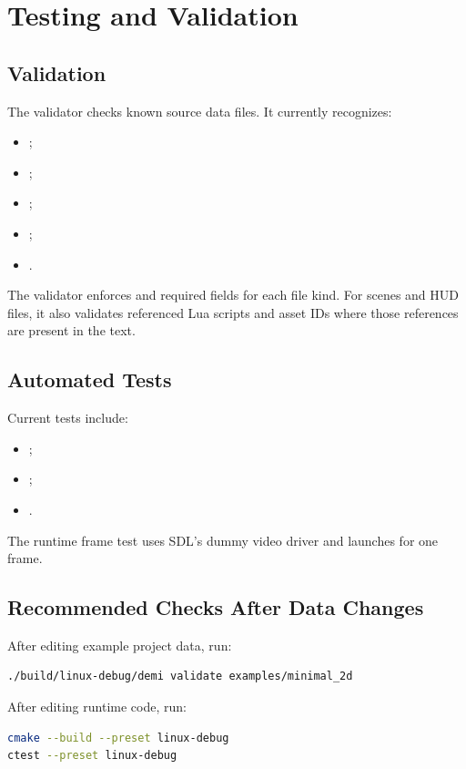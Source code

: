 \chapter{Testing and Validation}

\section{Validation}

The validator checks known source data files. It currently recognizes:

\begin{itemize}
  \item {};
  \item {};
  \item {};
  \item {};
  \item {}.
\end{itemize}

The validator enforces  and required fields for each file kind. For scenes and HUD files, it also validates referenced Lua scripts and asset IDs where those references are present in the text.

\section{Automated Tests}

Current tests include:

\begin{itemize}
  \item {};
  \item {};
  \item {}.
\end{itemize}

The runtime frame test uses SDL's dummy video driver and launches  for one frame.

\section{Recommended Checks After Data Changes}

After editing example project data, run:

\begin{lstlisting}[language=bash]
./build/linux-debug/demi validate examples/minimal_2d
\end{lstlisting}

After editing runtime code, run:

\begin{lstlisting}[language=bash]
cmake --build --preset linux-debug
ctest --preset linux-debug
\end{lstlisting}
